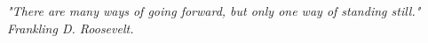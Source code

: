 \newpage \vspace*{8cm}
\thispagestyle{empty}
\begin{center}
	\large \emph{"There are many ways of going forward, but only one way of standing still." Frankling D. Roosevelt.}
\end{center}